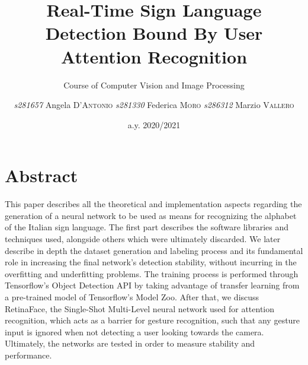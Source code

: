 \documentclass[a4paper, 12pt]{article}
\institute{Polytechnic of Turin}
\title{Real-Time Sign Language Detection Bound By User Attention Recognition }
\subtitle{Course of Computer Vision and Image Processing}
\author{\textit{s281657} Angela \textsc{D'Antonio}\linebreak
        \textit{s281330} Federica \textsc{Moro}\linebreak
        \textit{s286312} Marzio \textsc{Vallero}\linebreak}
\date{a.y. 2020/2021}
\begin{document}
\maketitle
\romantableofcontents
\sloppy
\twocolumn

\section{Abstract}
\label{Abstract}
This paper describes all the theoretical and implementation aspects regarding the generation of a neural network to be used as means for recognizing the alphabet of the Italian sign language.
The first part describes the software libraries and techniques used, alongside others which were ultimately discarded.
We later describe in depth the dataset generation and labeling process and its fundamental role in increasing the final network's detection stability, without incurring in the overfitting and underfitting problems.
The training process is performed through Tensorflow's Object Detection API by taking advantage of transfer learning from a pre-trained model of Tensorflow's Model Zoo.
After that, we discuss RetinaFace, the Single-Shot Multi-Level neural network used for attention recognition, which acts as a barrier for gesture recognition, such that any gesture input is ignored when not detecting a user looking towards the camera.
Ultimately, the networks are tested in order to measure stability and performance.
\end{document}

